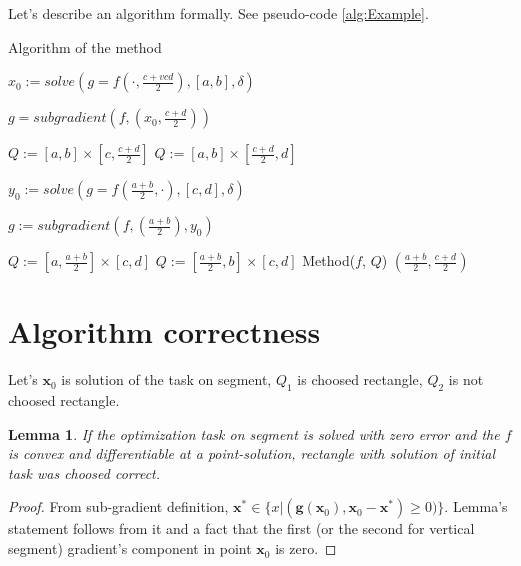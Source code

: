 \documentclass[12pt]{article}
\newtheorem{lemma}{Lemma}[section]
\begin{document}
Let's describe an algorithm formally. See pseudo-code \ref{alg:Example}.

\begin{algorithm}[H]
\caption{Algorithm of the method}\label{alg:Example}
\begin{algorithmic}[1]

$x_0:= solve(g = f(\cdot, \frac{c+vcd}{2}), [a,b], \delta)$
 
$g = subgradient(f, (x_0, \frac{c+d}{2}))$
 
\State$Q := [a,b] \times [c, \frac{c+d}{2}]$ 
\Else
\State$Q := [a,b] \times [\frac{c+d}{2}, d]$ 
\EndIf

 $y_0:= solve(g = f(\frac{a+b}{2}, \cdot), [c,d], \delta)$
 
 $g := subgradient(f, (\frac{a+b}{2}), y_0)$
 
 \State$Q := [a, \frac{a+b}{2}] \times [c, d]$ 
\Else
\State$Q := [\frac{a+b}{2},b] \times [c, d]$ 
\EndIf
{}
\State Method($f$, $Q$) 
\EndIf
\Return $(\frac{a+b}{2}, \frac{c+d}{2})$
\EndFunction 
 \end{algorithmic}
\end{algorithm}

\section{Algorithm correctness}
Let's $\textbf{x}_0$ is solution of the task on segment, $Q_1$ is choosed rectangle, $Q_2$ is not choosed rectangle.

\begin{lemma}\label{l1}
If the optimization task on segment is solved with zero error and the $f$ is convex and differentiable at a point-solution, rectangle with solution of initial task was choosed correct.
\end{lemma}
\begin{proof}
From sub-gradient definition, $\textbf{x}^* \in \{x|(\textbf{g}(\textbf{x}_0), \textbf{x}_0 - \textbf{x}^*) \geq 0)\}$. Lemma's statement follows from it and a fact that the first (or the second for vertical segment) gradient's component in point $\textbf{x}_0$ is zero.
\end{proof}
\end{document}
